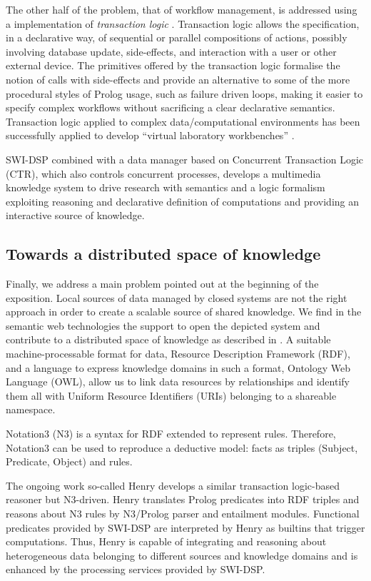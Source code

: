 \documentclass[runningheads]{llncs}
\begin{document}
The other half of the problem, that of workflow management, is addressed using a implementation of \emph{transaction logic} \cite{ctl}. Transaction logic allows the specification, in a declarative way, of sequential or parallel compositions of actions, possibly involving database update, side-effects, and interaction with a user or other external device. The primitives offered by the transaction logic formalise the notion of calls with side-effects and
provide an alternative to some of the more procedural styles of Prolog usage, such as failure driven loops, making it easier to specify complex workflows without sacrificing a clear declarative semantics. Transaction logic applied to complex data/computational environments has been successfully applied to develop ``virtual laboratory workbenches'' \cite{virtual}.

SWI-DSP combined with a data manager based on Concurrent Transaction Logic (CTR), which also controls concurrent processes, develops a multimedia knowledge system to drive research with semantics and a logic formalism exploiting reasoning and declarative definition of computations and providing an interactive source of knowledge.

\subsection{Towards a distributed space of knowledge}

Finally, we address a main problem pointed out at the beginning of the exposition. Local sources of data managed by closed systems are not the right approach in order to create a scalable source of shared knowledge. We find in the semantic web technologies the support to open the depicted system and contribute to a distributed space of knowledge as described in \cite{distributed}. A suitable machine-processable format for data, Resource Description Framework (RDF), and a language to express knowledge domains in such a format, Ontology Web Language (OWL), allow us to link data resources by relationships and identify them all with Uniform Resource Identifiers (URIs) belonging to a shareable namespace.

Notation3 (N3) \cite{n3} is a syntax for RDF extended to represent rules. Therefore, Notation3 can be used to reproduce a deductive model: facts as triples (Subject, Predicate, Object) and rules.

The ongoing work so-called Henry develops a similar transaction logic-based reasoner but N3-driven. Henry translates Prolog predicates into RDF triples and reasons about N3 rules by N3/Prolog parser and entailment modules. Functional predicates provided by SWI-DSP are interpreted by Henry as builtins that trigger computations. Thus, Henry is capable of integrating and reasoning about heterogeneous data belonging to different sources and knowledge domains and is enhanced by the processing services provided by SWI-DSP.
\end{document}
